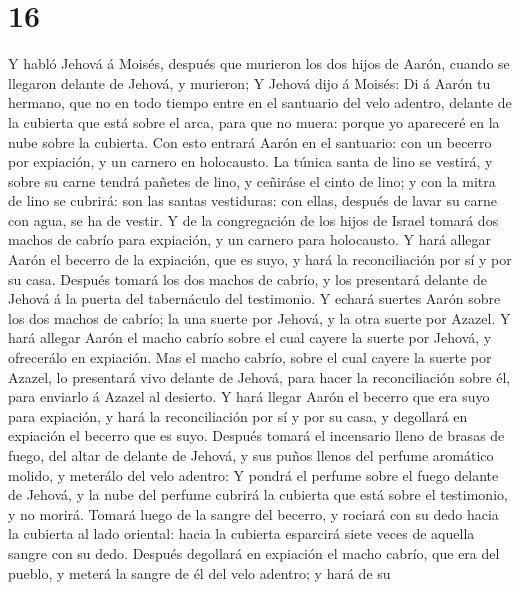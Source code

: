 \hypertarget{section-15}{%
\section{16}\label{section-15}}

 Y habló Jehová á Moisés, después que murieron los dos
hijos de Aarón, cuando se llegaron delante de Jehová, y murieron;
 Y Jehová dijo á Moisés: Di á Aarón tu hermano, que no en
todo tiempo entre en el santuario del velo adentro, delante de la
cubierta que está sobre el arca, para que no muera: porque yo apareceré
en la nube sobre la cubierta.  Con esto entrará Aarón en
el santuario: con un becerro por expiación, y un carnero en holocausto.
 La túnica santa de lino se vestirá, y sobre su carne
tendrá pañetes de lino, y ceñiráse el cinto de lino; y con la mitra de
lino se cubrirá: son las santas vestiduras: con ellas, después de lavar
su carne con agua, se ha de vestir.  Y de la congregación
de los hijos de Israel tomará dos machos de cabrío para expiación, y un
carnero para holocausto.  Y hará allegar Aarón el becerro
de la expiación, que es suyo, y hará la reconciliación por sí y por su
casa.  Después tomará los dos machos de cabrío, y los
presentará delante de Jehová á la puerta del tabernáculo del testimonio.
 Y echará suertes Aarón sobre los dos machos de cabrío; la
una suerte por Jehová, y la otra suerte por Azazel.  Y
hará allegar Aarón el macho cabrío sobre el cual cayere la suerte por
Jehová, y ofrecerálo en expiación.  Mas el macho cabrío,
sobre el cual cayere la suerte por Azazel, lo presentará vivo delante de
Jehová, para hacer la reconciliación sobre él, para enviarlo á Azazel al
desierto.  Y hará llegar Aarón el becerro que era suyo
para expiación, y hará la reconciliación por sí y por su casa, y
degollará en expiación el becerro que es suyo.  Después
tomará el incensario lleno de brasas de fuego, del altar de delante de
Jehová, y sus puños llenos del perfume aromático molido, y meterálo del
velo adentro:  Y pondrá el perfume sobre el fuego delante
de Jehová, y la nube del perfume cubrirá la cubierta que está sobre el
testimonio, y no morirá.  Tomará luego de la sangre del
becerro, y rociará con su dedo hacia la cubierta al lado oriental: hacia
la cubierta esparcirá siete veces de aquella sangre con su dedo.
 Después degollará en expiación el macho cabrío, que era
del pueblo, y meterá la sangre de él del velo adentro; y hará de su

